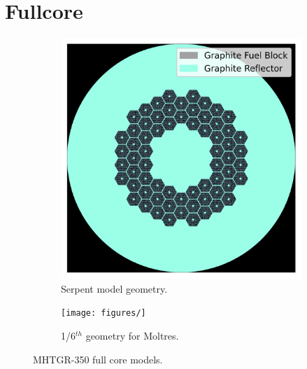 \documentclass[11pt,letterpaper]{article}
\begin{document}
\section{Fullcore}

\begin{figure}[htbp!]
	\centering
	\begin{subfigure}[t]{0.4\textwidth}
		\centering
		\includegraphics[width=\linewidth]{figures/oecd-fullcore}
		\caption{Serpent model geometry.}
	\end{subfigure}
	\begin{subfigure}[t]{0.4\textwidth}
		\centering
		\texttt{[image: figures/]}
		\caption{1/6$^{th}$ geometry for Moltres.}
	\end{subfigure}
	\hfill
	\caption{MHTGR-350 full core models.}
	\label{fig:}
\end{figure}

\pagebreak


\end{document}
